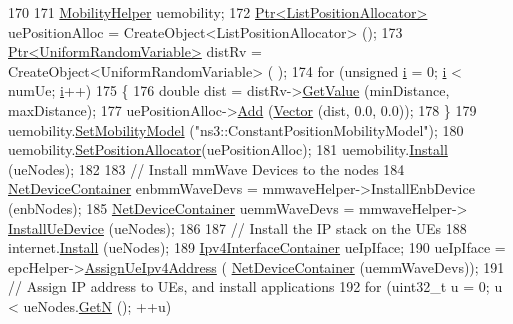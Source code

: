 \begin{DoxyCode}
170 
171   \hyperlink{classns3_1_1MobilityHelper}{MobilityHelper} uemobility;
172   \hyperlink{classns3_1_1Ptr}{Ptr<ListPositionAllocator>} uePositionAlloc = 
      CreateObject<ListPositionAllocator> ();
173         \hyperlink{classns3_1_1Ptr}{Ptr<UniformRandomVariable>} distRv = CreateObject<UniformRandomVariable> (
      );
174         \textcolor{keywordflow}{for} (\textcolor{keywordtype}{unsigned} \hyperlink{bernuolliDistribution_8m_a6f6ccfcf58b31cb6412107d9d5281426}{i} = 0; \hyperlink{bernuolliDistribution_8m_a6f6ccfcf58b31cb6412107d9d5281426}{i} < numUe; \hyperlink{bernuolliDistribution_8m_a6f6ccfcf58b31cb6412107d9d5281426}{i}++)
175         \{
176                 \textcolor{keywordtype}{double} dist = distRv->\hyperlink{classns3_1_1UniformRandomVariable_a03822d8c86ac51e9aa83bbc73041386b}{GetValue} (minDistance, maxDistance);
177                 uePositionAlloc->\hyperlink{classns3_1_1ListPositionAllocator_a460e82f015ac012a73ba0ea0cccb3486}{Add} (\hyperlink{classns3_1_1Vector3D_a7e59b47bc94c9cb1dadff68c1d0112d8}{Vector} (dist, 0.0, 0.0));
178         \}
179         uemobility.\hyperlink{classns3_1_1MobilityHelper_a030275011b6f40682e70534d30280aba}{SetMobilityModel} (\textcolor{stringliteral}{"ns3::ConstantPositionMobilityModel"});
180   uemobility.\hyperlink{classns3_1_1MobilityHelper_ac59d5295076be3cc11021566713a28c5}{SetPositionAllocator}(uePositionAlloc);
181   uemobility.\hyperlink{classns3_1_1MobilityHelper_a07737960ee95c0777109cf2994dd97ae}{Install} (ueNodes);
182 
183   \textcolor{comment}{// Install mmWave Devices to the nodes}
184   \hyperlink{classns3_1_1NetDeviceContainer}{NetDeviceContainer} enbmmWaveDevs = mmwaveHelper->InstallEnbDevice (enbNodes);
185   \hyperlink{classns3_1_1NetDeviceContainer}{NetDeviceContainer} uemmWaveDevs = mmwaveHelper->
      \hyperlink{classns3_1_1MmWaveHelper_a9311c819d7ee539c8710c5b7e98df37a}{InstallUeDevice} (ueNodes);
186 
187   \textcolor{comment}{// Install the IP stack on the UEs}
188   internet.\hyperlink{classns3_1_1InternetStackHelper_a6645b412f31283d2d9bc3d8a95cebbc0}{Install} (ueNodes);
189   \hyperlink{classns3_1_1Ipv4InterfaceContainer}{Ipv4InterfaceContainer} ueIpIface;
190   ueIpIface = epcHelper->\hyperlink{classns3_1_1MmWavePointToPointEpcHelper_ad96757d4c63d33f683dce1b5d6bca3b9}{AssignUeIpv4Address} (
      \hyperlink{classns3_1_1NetDeviceContainer}{NetDeviceContainer} (uemmWaveDevs));
191   \textcolor{comment}{// Assign IP address to UEs, and install applications}
192   \textcolor{keywordflow}{for} (uint32\_t u = 0; u < ueNodes.\hyperlink{classns3_1_1NodeContainer_aed647ac56d0407a7706aba02eb44b951}{GetN} (); ++u)

\end{DoxyCode}
